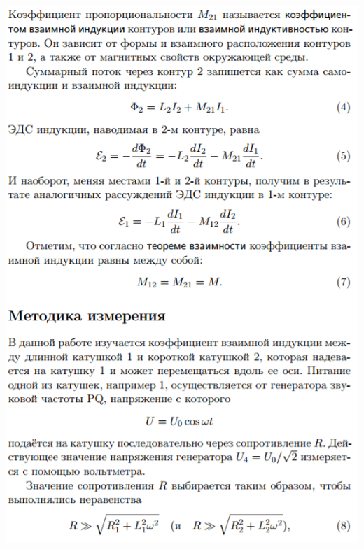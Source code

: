 \documentclass[12pt]{article}
\begin{document}
\begin{center}
    	\includegraphics[width=15cm]{theory3.png}

\end{center}
\end{document}
